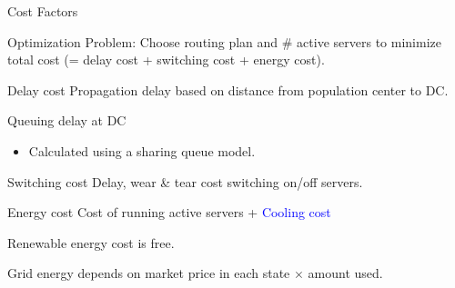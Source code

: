 \documentclass[xcolor=dvipsnames]{beamer}
\newcommand{\bi}{\begin{itemize}}
\newcommand{\ei}{\end{itemize}}
\newcommand{\itm}{\item}
\begin{document}
\begin{frame}{Cost Factors}

 Optimization Problem: Choose routing plan and \# active servers to minimize total cost (= delay cost + switching cost + energy cost).

\begin{block}{Delay cost}
 Propagation delay based on distance from population center to DC. 

Queuing delay at DC
		\bi \itm Calculated using a sharing queue model. \ei
\end{block}

\begin{block}{Switching cost}
Delay, wear \& tear cost switching on/off servers. %
\end{block}

\begin{block}{Energy cost}
Cost of running active servers + \textcolor{blue}{Cooling cost} 

Renewable energy cost is free.

Grid energy depends on market price in each state $\times$ amount used. 
\end{block}

\end{frame}
\end{document}
